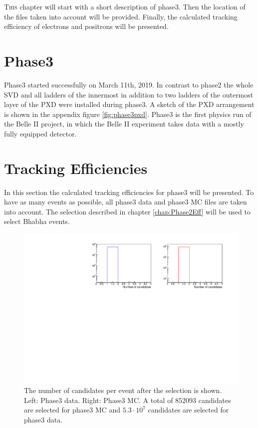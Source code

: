 \documentclass[a4paper,11pt,twosided,final,german,openbib,pdftex,listof=totoc,bibliography=totoc]{scrbook}
\begin{document}
\lettrine{T}{his} chapter will start with a short description of phase3. Then the location of the files taken into account will be provided. Finally, the calculated tracking efficiency of electrons and positrons will be presented.

\section{Phase3}
\label{sec:P3}

Phase3 started successfully on March 11th, 2019. In contrast to phase2 the whole SVD and all ladders of the innermost in addition to two ladders of the outermost layer of the PXD were installed during phase3. A sketch of the PXD arrangement is shown in the appendix figure \ref{fig:phase3pxd}. Phase3 is the first physics run of the Belle II project, in which the Belle II experiment takes data with a mostly fully equipped detector.\cite{phase3}





\section{Tracking Efficiencies}

In this section the calculated tracking efficiencies for phase3 will be presented. To have as many events as possible, all phase3 data and phase3 MC files are taken into account. 
The selection described in chapter \ref{chap:Phase2Eff} will be used to select Bhabha events.

\begin{figure}[h!]
	\includegraphics[width=\textwidth]{Plots/master3/CCandP3.pdf}
	\caption[Total Number Of Events After The Selection Phase3]{The number of candidates per event after the selection is shown. Left: Phase3 data. Right: Phase3 MC. A total of 852093 candidates are selected for phase3 MC and $5.3\cdot10^7$ candidates are selected for phase3 data.}
	\label{fig:nCandAS3}
\end{figure}
\end{document}
